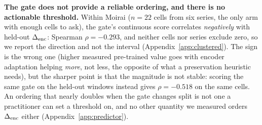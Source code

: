 \textbf{The gate does not provide a reliable ordering, and there is no actionable
threshold.}
Within Moirai ($n{=}22$ cells from six series, the only arm with enough cells to
ask), the gate's continuous score correlates \emph{negatively} with held-out
$\Delta_\text{enc}$: Spearman $\rho{=}{-}0.293$, and neither cells nor series exclude zero, so
we report the direction and not the interval (Appendix~\ref{app:clustered}).
The sign is the wrong one (higher measured pre-trained value goes with encoder
adaptation helping \emph{more}, not less, the opposite of what a preservation
heuristic needs), but the sharper point is that the magnitude is not stable:
scoring the same gate on the held-out windows instead gives $\rho{=}{-}0.518$
on the same cells.
An ordering that nearly doubles when the gate changes split is not one a
practitioner can set a threshold on, and no other quantity we measured orders
$\Delta_\text{enc}$ either (Appendix~\ref{app:predictor}).

\begin{table}[ht]
\centering
\caption{\textbf{The pre-registered prospective test.} Predictions frozen in
git before any condition-B or -D run for these cells existed. ``Degradation''
applies the paper's own definition unchanged: gate-passing $\wedge$
forg$_\text{B}{>}0$ in every seed $\wedge$ forg$_\text{D}{<}0$ in every seed.
gate$_\text{pre}$ is the frozen predictor's score, on the pre-correction
denominator; gate$_\text{val}$ is the corrected selection-split gate of
\S\ref{sec:forecasting}.}
\label{tab:prospective}

\end{table}

\begin{table}[ht]
\centering
\caption{Gate threshold sensitivity on the eight pre-registered cells
(\S\ref{sec:analysis:prospective}). The predictor and the outcome definition
are both as pre-registered; only the threshold moves. Bold is the operating
point used in the paper.}
\label{tab:gate_sensitivity}

\end{table}

\clearpage
